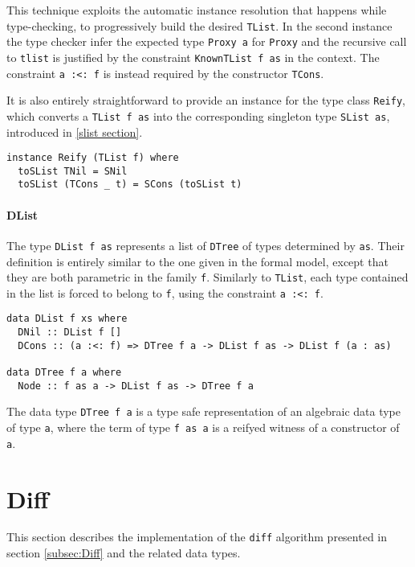 \documentclass[../Thesis.tex]{subfiles}
\begin{document}
	This technique exploits the automatic instance resolution that happens
	while type-checking, to progressively build the desired \texttt{TList}.
	In the second instance the type checker infer the expected type 
	\texttt{Proxy a} for \texttt{Proxy} and the recursive call to \texttt{tlist} is 
	justified by the constraint  \texttt{KnownTList f as} in the context. 
	The constraint \texttt{a :<: f} is 	instead required by	the constructor 
	\texttt{TCons}.
		
	It is also entirely straightforward to provide an instance for the 
	type	class \texttt{Reify}, which converts a \texttt{TList f as} 
	into the corresponding singleton type 
	\texttt{SList as}, introduced in \ref{slist section}. 

\begin{verbatim}
instance Reify (TList f) where
  toSList TNil = SNil
  toSList (TCons _ t) = SCons (toSList t)
\end{verbatim}
	
	\paragraph{DList}
	The type \texttt{DList f as} represents a list of \texttt{DTree} of types
	determined by 	\texttt{as}. Their definition is entirely similar to
	the one given in the formal model, except that they are both parametric
	in the family \texttt{f}. Similarly to \texttt{TList}, each type contained
	in the list is forced to belong to \texttt{f}, using the constraint 
	\texttt{a :<: f}.
	
\begin{verbatim}
data DList f xs where
  DNil :: DList f []
  DCons :: (a :<: f) => DTree f a -> DList f as -> DList f (a : as)

data DTree f a where
  Node :: f as a -> DList f as -> DTree f a
\end{verbatim}
	
	The data type \texttt{DTree f a} is a type safe representation of
	an algebraic data type of type \texttt{a}, where the term
	of type \texttt{f as a} is a reifyed witness of a constructor 
	of \texttt{a}.
	
	\section{Diff}
	This section describes the implementation of the 
	\texttt{diff} algorithm presented in 	section \ref{subsec:Diff} 
	and the related data types. 
	
\end{document}
